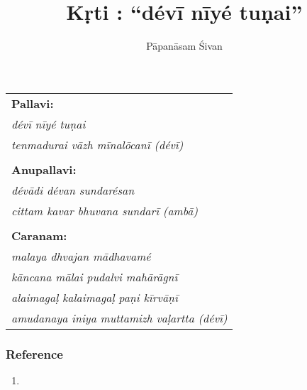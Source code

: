 




\title{K\d rti : ``d\'ev\=i n\=iy\'e tu\d{n}ai''}
\author{P\=apan\=asam \'Sivan}


\maketitle


\vspace{0.25 in}

%
%
%
%
%


\begin{tabular}{l}
\textbf{Pallavi:}\\
\emph{d\'ev\=i n\=iy\'e tu\d{n}ai}\\
\emph{tenmadurai v\=azh m\=inal\=ocan\=i (d\'ev\=i)}\\
\\
\textbf{Anupallavi:}\\
\emph{d\'ev\=adi d\'evan sundar\'esan}\\
\emph{cittam kavar bhuvana sundar\=i (amb\=a)}\\
\\
\textbf{Caranam:}\\
\emph{malaya dhvajan m\=adhavam\'e}\\
\emph{k\=ancana m\=alai pudalvi mah\=ar\=agn\=i}\\
\emph{alaimaga\d{l} kalaimaga\d{l} pa\d{n}i k\=irv\=a\d{n}\=i}\\
\emph{amudanaya iniya muttamizh va\d{l}artta (d\'ev\=i)}
\end{tabular}

\subsubsection*{Reference}

\begin{enumerate}
\item {}
\end{enumerate}

  

